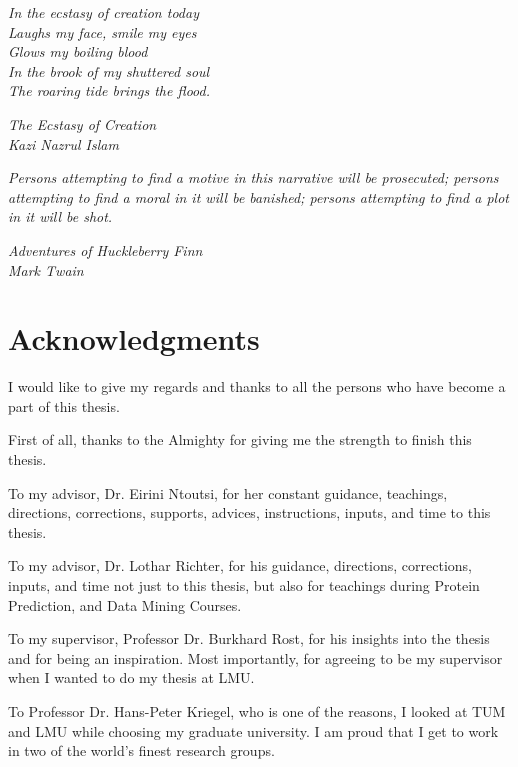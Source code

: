 \thispagestyle{empty}


\vspace*{2mm}

\epigraph{\textit{In the ecstasy of creation today\\
        Laughs my face, smile my eyes \\
        Glows my boiling blood \\
        In the brook of my shuttered soul \\
        The roaring tide brings the flood.} }{\textit{The Ecstasy of Creation \\ Kazi Nazrul Islam}}

\epigraph{\textit{Persons attempting to find a motive in this narrative will be prosecuted;
        persons attempting to find a moral in it will be banished;
        persons attempting to find a plot in it will be shot.} }
        {\textit{Adventures of Huckleberry Finn \\ Mark Twain}}



\section* {Acknowledgments}
\vspace{7mm}
I would like to give my regards and thanks to all the persons who have become a part of this thesis.

\vspace{4mm} First of all, thanks to the Almighty for giving me the strength to finish this thesis.

\vspace{2mm} To my advisor, Dr. Eirini Ntoutsi, for her constant guidance, teachings, directions, corrections, supports, advices, instructions, inputs, and time to this thesis.

\vspace{2mm} To my advisor, Dr. Lothar Richter, for his guidance, directions, corrections, inputs, and time not just to this thesis, but also for teachings during Protein Prediction, and Data Mining Courses.

\vspace{2mm} To my supervisor, Professor Dr. Burkhard Rost, for his insights into the thesis and for being an inspiration. Most importantly, for agreeing to be my supervisor when I wanted to do my thesis at LMU.

\vspace{2mm} To Professor Dr. Hans-Peter Kriegel, who is one of the reasons, I looked at TUM and LMU while choosing my graduate university. I am proud that I get to work in two of the world's finest research groups.

